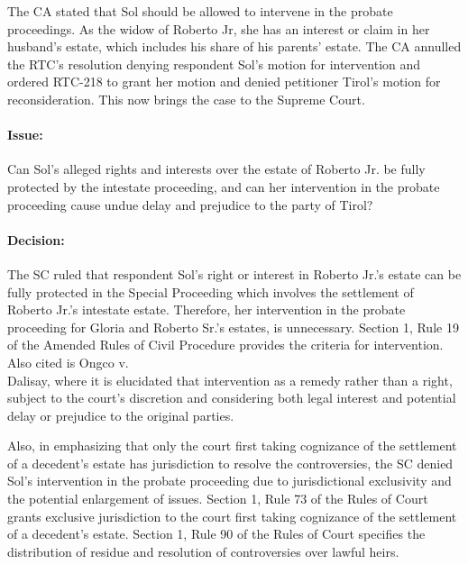 \documentclass[
12pt,
oneside,
onehalfspacing,
headsepline
]{DigestCollection}
\begin{document}
The CA stated that Sol should be allowed to intervene in the probate proceedings. As the widow of Roberto Jr, she has an interest or claim in her husband's estate, which includes his share of his parents' estate. The CA annulled the RTC's resolution denying respondent Sol's motion for intervention and ordered RTC-218 to grant her motion and denied petitioner Tirol's motion for reconsideration. This now brings the case to the Supreme Court. 

\paragraph{Issue:}
\label{d0a69a50-09fd-11ef-932c-63c852f65e48}


Can Sol's alleged rights and interests over the estate of Roberto Jr. be fully protected by the intestate proceeding, and can her intervention in the probate proceeding cause undue delay and prejudice to the party of Tirol?

\paragraph{Decision:}
\label{d2542340-09fd-11ef-932c-63c852f65e48}


The SC ruled that respondent Sol's right or interest in Roberto Jr.'s estate can be fully protected in the Special Proceeding which involves the settlement of Roberto Jr.'s intestate estate. Therefore, her intervention in the probate proceeding for Gloria and Roberto Sr.'s estates, is unnecessary. Section 1, Rule 19 of the Amended Rules of Civil Procedure provides the criteria for intervention. Also cited is Ongco v. \\Dalisay, where it is elucidated that intervention as a remedy rather than a right, subject to the court's discretion and considering both legal interest and potential delay or prejudice to the original parties. 

Also, in emphasizing that only the court first taking cognizance of the settlement of a decedent's estate has jurisdiction to resolve the controversies, the SC denied Sol's intervention in the probate proceeding due to jurisdictional exclusivity and the potential enlargement of issues. Section 1, Rule 73 of the Rules of Court grants exclusive jurisdiction to the court first taking cognizance of the settlement of a decedent's estate. Section 1, Rule 90 of the Rules of Court specifies the distribution of residue and resolution of controversies over lawful heirs. 
\end{document}
